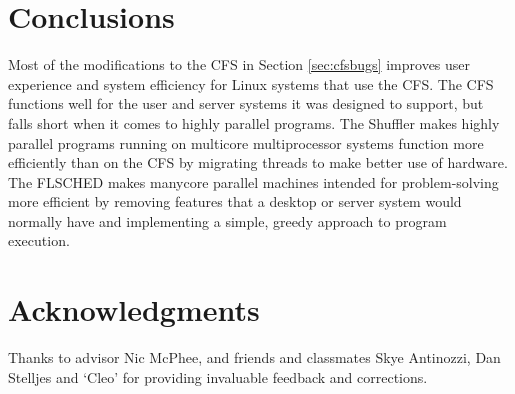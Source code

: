\documentclass{sig-alternate}
\begin{document}
\section{Conclusions}
\label{sec:conclusions}

Most of the modifications to the CFS in Section \ref{sec:cfsbugs} improves user experience and system efficiency for Linux systems that use the CFS. The CFS functions well for the user and server systems it was designed to support, but falls short when it comes to highly parallel programs. The Shuffler makes highly parallel programs running on multicore multiprocessor systems function more efficiently than on the CFS by migrating threads to make better use of hardware. The FLSCHED makes manycore parallel machines intended for problem-solving more efficient by removing features that a desktop or server system would normally have and implementing a simple, greedy approach to program execution.

\section*{Acknowledgments}
\label{sec:acknowledgments}
Thanks to advisor Nic McPhee, and friends and classmates Skye Antinozzi, Dan Stelljes and `Cleo' for providing invaluable feedback and corrections.


  
\end{document}
